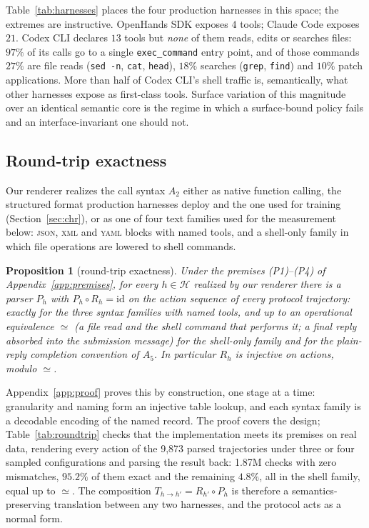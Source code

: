 \documentclass{article} %
\newtheorem{proposition}{Proposition}
\newcommand{\claudecode}{Claude Code}
\newcommand{\codexcli}{Codex CLI}
\newcommand{\openhands}{OpenHands SDK}   %
\newcommand{\numtraj}{9{,}873}            %
\newcommand{\numroundtrip}{1.87M}         %
\begin{document}
Table~\ref{tab:harnesses} places the four production harnesses in this space;
the extremes are instructive. \openhands{} exposes $4$ tools; \claudecode{} exposes $21$.
\codexcli{} declares $13$ tools but \emph{none} of them reads, edits or searches
files: $97\%$ of its calls go to a single \texttt{exec\_command} entry point,
and of those commands $27\%$ are file reads (\texttt{sed -n}, \texttt{cat},
\texttt{head}), $18\%$ searches (\texttt{grep}, \texttt{find}) and $10\%$
patch applications. More than half of \codexcli{}'s
shell traffic is, semantically, what other harnesses expose as first-class
tools. Surface variation of this magnitude over an identical semantic core is the
regime in which a surface-bound policy fails and an
interface-invariant one should not.

\subsection{Round-trip exactness}

Our renderer realizes the call syntax $A_2$ either as native function calling,
the structured format production harnesses deploy and the one used for
training (Section~\ref{sec:chr}), or as one of four text families used for the
measurement below: \textsc{json}, \textsc{xml} and \textsc{yaml} blocks with
named tools, and a shell-only family in which file operations are lowered to
shell commands.

\begin{proposition}[round-trip exactness]\label{prop:roundtrip}
Under the premises
(P1)--(P4) of Appendix~\ref{app:premises}, for every $h \in \mathcal{H}$
realized by our renderer there is a parser $P_h$ with $P_h \circ R_h =
\mathrm{id}$ on the action sequence of every protocol trajectory: exactly for
the three syntax families with named tools, and up to an operational
equivalence $\simeq$ (a file read and the shell command that performs it; a
final reply absorbed into the submission message) for the shell-only family
and for the plain-reply completion convention of $A_5$. In particular $R_h$ is
injective on actions, modulo $\simeq$.
\end{proposition}
\noindent Appendix~\ref{app:proof} proves this by construction, one stage at a
time: granularity and naming form an injective table lookup, and each syntax
family is a decodable encoding of the named record. The proof covers the
design; Table~\ref{tab:roundtrip} checks that the implementation meets its
premises on real data, rendering every action of the \numtraj{} parsed
trajectories under three or four sampled configurations and parsing the result
back: \numroundtrip{} checks with zero mismatches, $95.2\%$ of them exact and
the remaining $4.8\%$, all in the shell family, equal up to $\simeq$. The
composition $T_{h \to h'} = R_{h'} \circ P_h$ is therefore a
semantics-preserving translation between any two harnesses, and the protocol
acts as a normal form.
\end{document}
